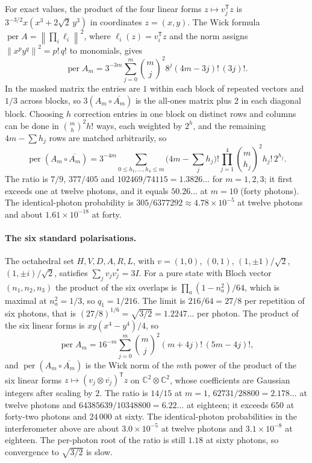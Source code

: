 \documentclass[11pt,a4paper]{article}
\theoremstyle{remark}
\newcommand{\per}{\operatorname{per}}
\newcommand{\norm}[1]{\left\lVert#1\right\rVert}
\newcommand{\C}{\mathbb C}
\begin{document}
For exact values, the product of the four linear forms $z\mapsto v_j^{\mathsf T}z$ is $3^{-3/2}x(x^3+2\sqrt2\,y^3)$ in coordinates $z=(x,y)$. The Wick formula $\per A=\norm{\prod_i\ell_i}^2$, where $\ell_i(z)=v_i^{\mathsf T}z$ and the norm assigns $\norm{x^py^q}^2=p!\,q!$ to monomials, gives
\[
 \per A_m=3^{-3m}\sum_{j=0}^m\binom mj^2 8^j(4m-3j)!\,(3j)!.
\]
In the masked matrix the entries are $1$ within each block of repeated vectors and $1/3$ across blocks, so $3(A_m\circ\overline{A_m})$ is the all-ones matrix plus $2$ in each diagonal block. Choosing $h$ correction entries in one block on distinct rows and columns can be done in $\binom mh^2h!$ ways, each weighted by $2^h$, and the remaining $4m-\sum h_j$ rows are matched arbitrarily, so
\[
 \per(A_m\circ\overline{A_m})=3^{-4m}\sum_{0\le h_1,\dots,h_4\le m}\Big(4m-\textstyle\sum_jh_j\Big)!\prod_{j=1}^4\binom m{h_j}^{\!2}h_j!\,2^{h_j}.
\]
The ratio is $7/9$, $377/405$ and $102469/74115=1.3826\ldots$ for $m=1,2,3$; it first exceeds one at twelve photons, and it equals $50.26\ldots$ at $m=10$ (forty photons). The identical-photon probability is $305/6377292\approx4.78\times10^{-5}$ at twelve photons and about $1.61\times10^{-18}$ at forty.

\paragraph{The six standard polarisations.}
The octahedral set $H,V,D,A,R,L$, with $v=(1,0)$, $(0,1)$, $(1,\pm1)/\sqrt2$, $(1,\pm i)/\sqrt2$, satisfies $\sum_jv_jv_j^*=3I$. For a pure state with Bloch vector $(n_1,n_2,n_3)$ the product of the six overlaps is $\prod_{a}(1-n_a^2)/64$, which is maximal at $n_a^2=1/3$, so $q_1=1/216$. The limit is $216/64=27/8$ per repetition of six photons, that is $(27/8)^{1/6}=\sqrt{3/2}=1.2247\ldots$ per photon. The product of the six linear forms is $xy(x^4-y^4)/4$, so
\[
 \per A_m=16^{-m}\sum_{j=0}^m\binom mj^2(m+4j)!\,(5m-4j)!,
\]
and $\per(A_m\circ\overline{A_m})$ is the Wick norm of the $m$th power of the product of the six linear forms $z\mapsto(v_j\otimes\overline{v_j})^{\mathsf T}z$ on $\C^2\otimes\C^2$, whose coefficients are Gaussian integers after scaling by $2$. The ratio is $14/15$ at $m=1$, $62731/28800=2.178\ldots$ at twelve photons and $64385639/10348800=6.22\ldots$ at eighteen; it exceeds $650$ at forty-two photons and $24\,000$ at sixty. The identical-photon probabilities in the interferometer above are about $3.0\times10^{-5}$ at twelve photons and $3.1\times10^{-8}$ at eighteen. The per-photon root of the ratio is still $1.18$ at sixty photons, so convergence to $\sqrt{3/2}$ is slow.
\end{document}
